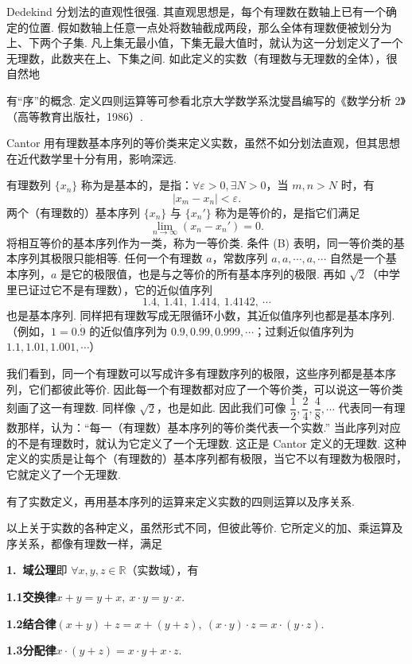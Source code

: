 \documentclass[UTF8,12pt,a4paper,fontset=fandol]{ctexart}
\begin{document}
Dedekind 分划法的直观性很强. 其直观思想是，每个有理数在数轴上已有一个确定的位置. 假如数轴上任意一点处将数轴截成两段，那么全体有理数便被划分为上、下两个子集. 凡上集无最小值，下集无最大值时，就认为这一分划定义了一个无理数，此数夹在上、下集之间. 如此定义的实数（有理数与无理数的全体），很自然地

有“序”的概念. 定义四则运算等可参看北京大学数学系沈燮昌编写的《数学分析 2》（高等教育出版社，1986）.

Cantor 用有理数基本序列的等价类来定义实数，虽然不如分划法直观，但其思想在近代数学里十分有用，影响深远.

有理数列 $\{x_n\}$ 称为是基本的，是指：$\forall \varepsilon>0,\exists N>0$，当 $m,n>N$ 时，有
\[
  |x_m-x_n|<\varepsilon.
\tag{A}
\]
两个（有理数的）基本序列 $\{x_n\}$ 与 $\{x_n'\}$ 称为是等价的，是指它们满足
\[
  \lim_{n\to\infty}(x_n-x_n')=0.
\tag{B}
\]
将相互等价的基本序列作为一类，称为一等价类. 条件 (B) 表明，同一等价类的基本序列其极限只能相等. 任何一个有理数 $a$，常数序列 $a,a,\cdots,a,\cdots$ 自然是一个基本序列，$a$ 是它的极限值，也是与之等价的所有基本序列的极限. 再如 $\sqrt2$（中学里已证过它不是有理数），它的近似值序列
\[
  1.4,\ 1.41,\ 1.414,\ 1.4142,\ \cdots
\]
也是基本序列. 同样把有理数写成无限循环小数，其近似值序列也都是基本序列.（例如，$1=0.\dot9$ 的近似值序列为 $0.9,0.99,0.999,\cdots$；过剩近似值序列为 $1.1,1.01,1.001,\cdots$）

我们看到，同一个有理数可以写成许多有理数序列的极限，这些序列都是基本序列，它们都彼此等价. 因此每一个有理数都对应了一个等价类，可以说这一等价类刻画了这一有理数. 同样像 $\sqrt2$，也是如此. 因此我们可像 $\dfrac12,\dfrac24,\dfrac48,\cdots$ 代表同一有理数那样，认为：“每一（有理数）基本序列的等价类代表一个实数.” 当此序列对应的不是有理数时，就认为它定义了一个无理数. 这正是 Cantor 定义的无理数. 这种定义的实质是让每个（有理数的）基本序列都有极限，当它不以有理数为极限时，它就定义了一个无理数.

有了实数定义，再用基本序列的运算来定义实数的四则运算以及序关系.

以上关于实数的各种定义，虽然形式不同，但彼此等价. 它所定义的加、乘运算及序关系，都像有理数一样，满足

\noindent\textbf{1.\ 域公理}\quad 即 $\forall x,y,z\in \mathbb{R}$（实数域），有

\noindent\textbf{1.1\quad 交换律}\quad $x+y=y+x,\ x\cdot y=y\cdot x$.

\noindent\textbf{1.2\quad 结合律}\quad $(x+y)+z=x+(y+z),\ (x\cdot y)\cdot z=x\cdot(y\cdot z)$.

\noindent\textbf{1.3\quad 分配律}\quad $x\cdot(y+z)=x\cdot y+x\cdot z$.
\end{document}

